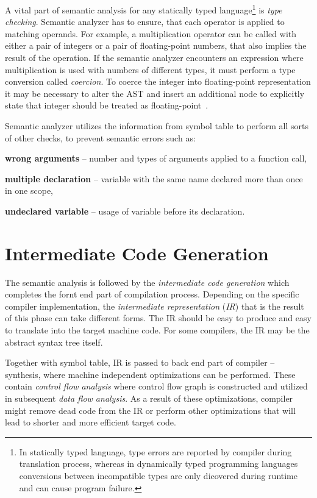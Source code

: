 \documentclass[
  digital, %
  table,   %
  lof,     %
  lot,     %
  oneside,
]{fithesis3}
\begin{document}
A vital part of semantic analysis for any statically typed language\footnote{In statically typed language, type errors are reported by compiler during translation process, whereas in dynamically typed programming languages conversions between incompatible types are only dicovered during runtime and can cause program failure.} is \textit{type checking}. Semantic analyzer has to ensure, that each operator is applied to matching operands. For example, a multiplication operator can be called with either a pair of integers or a pair of floating-point numbers, that also implies the result of the operation. If the semantic analyzer encounters an expression where multiplication is used with numbers of different types, it must perform a type conversion called \textit{coercion}. To coerce the integer into floating-point representation it may be necessary to alter the AST and insert an additional node to explicitly state that integer should be treated as floating-point~\cite{dragon-book}. 

Semantic analyzer utilizes the information from symbol table to perform all sorts of other checks, to prevent semantic errors such as:
\begin{compactitem}
  \item \textbf{wrong arguments} -- number and types of arguments applied to a function call,
  \item \textbf{multiple declaration} -- variable with the same name declared more than once in one scope,
  \item \textbf{undeclared variable} -- usage of variable before its declaration.
\end{compactitem}
    
  \section{Intermediate Code Generation}
The semantic analysis is followed by the \textit{intermediate code generation} which completes the fornt end part of compilation process. Depending on the specific compiler implementation, the \textit{intermediate representation} (\textit{IR}) that is the result of this phase can take different forms. The IR should be easy to produce and easy to translate into the target machine code. For some compilers, the IR may be the abstract syntax tree itself.

\bigskip
Together with symbol table, IR is passed to back end part of compiler -- synthesis, where machine independent optimizations can be performed. These contain \textit{control flow analysis} where control flow graph is constructed and utilized in subsequent \textit{data flow analysis}. As a result of these optimizations, compiler might remove dead code from the IR or perform other optimizations that will lead to shorter and more efficient target code.
\end{document}

